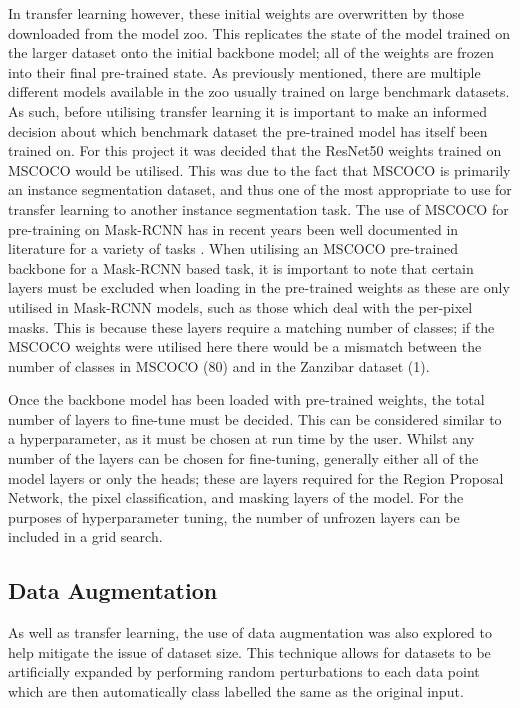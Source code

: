 In transfer learning however, these initial weights are overwritten by those downloaded from the model zoo. This replicates the state of the model trained on the larger dataset onto the initial backbone model; all of the weights are frozen into their final pre-trained state. As previously mentioned, there are multiple different models available in the zoo usually trained on large benchmark datasets. As such, before utilising transfer learning it is important to make an informed decision about which benchmark dataset the pre-trained model has itself been trained on. For this project it was decided that the ResNet50 weights trained on MSCOCO would be utilised. This was due to the fact that MSCOCO is primarily an instance segmentation dataset, and thus one of the most appropriate to use for transfer learning to another instance segmentation task. The use of MSCOCO for pre-training on Mask-RCNN has in recent years been well documented in literature for a variety of tasks \cite{yu_fruit_2019, couteaux_automatic_2019, fujita_fine-tuned_2020}. When utilising an MSCOCO pre-trained backbone for a Mask-RCNN based task, it is important to note that certain layers must be excluded when loading in the pre-trained weights as these are only utilised in Mask-RCNN models, such as those which deal with the per-pixel masks. This is because these layers require a matching number of classes; if the MSCOCO weights were utilised here there would be a mismatch between the number of classes in MSCOCO (80) and in the Zanzibar dataset (1).

Once the backbone model has been loaded with pre-trained weights, the total number of layers to fine-tune must be decided. This can be considered similar to a hyperparameter, as it must be chosen at run time by the user. Whilst any number of the layers can be chosen for fine-tuning, generally either all of the model layers or only the heads; these are layers required for the Region Proposal Network, the pixel classification, and masking layers of the model. For the purposes of hyperparameter tuning, the number of unfrozen layers can be included in a grid search.

\subsection{Data Augmentation}\label{ch:cetDet,sec:initialTesting,sub:dataaugmentation}

As well as transfer learning, the use of data augmentation was also explored to help mitigate the issue of dataset size. This technique allows for datasets to be artificially expanded by performing random perturbations to each data point which are then automatically class labelled the same as the original input. 

